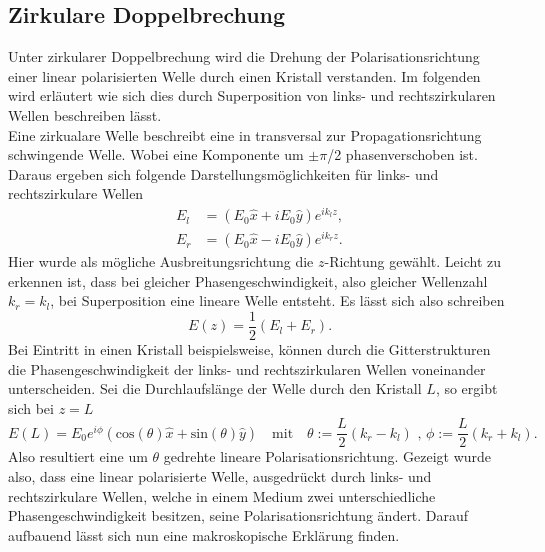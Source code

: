 \subsection{Zirkulare Doppelbrechung}

Unter zirkularer Doppelbrechung wird die Drehung der Polarisationsrichtung einer linear polarisierten Welle durch einen Kristall verstanden. 
Im folgenden wird erläutert wie sich dies durch Superposition von links- und rechtszirkularen Wellen beschreiben lässt.
\\
Eine zirkualare Welle beschreibt eine in transversal zur Propagationsrichtung schwingende Welle. Wobei eine Komponente um $\pm \pi$/2 phasenverschoben ist.
Daraus ergeben sich folgende Darstellungsmöglichkeiten für links- und rechtszirkulare Wellen
\begin{align}
    \label{eqn:crying1}
E_l &= (E_0 \hat{x} + i E_0 \hat{y}) e^{ik_l z}, \\
    \label{eqn:crying2}
E_r &= (E_0 \hat{x} - i E_0 \hat{y}) e^{ik_r z}.
\end{align}
Hier wurde als mögliche Ausbreitungsrichtung die $z$-Richtung gewählt. Leicht zu erkennen ist, dass bei gleicher Phasengeschwindigkeit, also gleicher Wellenzahl $k_r = k_l$, bei Superposition eine lineare Welle entsteht.
Es lässt sich also schreiben
\begin{equation*}
E(z) = \frac{1}{2} (E_l + E_r).
\end{equation*}
Bei Eintritt in einen Kristall beispielsweise, können durch die Gitterstrukturen die Phasengeschwindigkeit der links- und rechtszirkularen Wellen
voneinander unterscheiden. Sei die Durchlaufslänge der Welle durch den Kristall $L$, so ergibt sich bei $z=L$
\begin{equation*}
    E(L) = E_0 e^{i \phi} (\text{cos}(\theta)\hat{x} + \text{sin}(\theta) \hat{y} ) \quad \text{mit} \quad \theta := \frac{L}{2} (k_r - k_l) \text{ , } \phi := \frac{L}{2} (k_r + k_l).
\end{equation*}
Also resultiert eine um $\theta$ gedrehte lineare Polarisationsrichtung. Gezeigt wurde also, dass eine linear polarisierte Welle, ausgedrückt durch links- und 
rechtszirkulare Wellen, welche in einem Medium zwei
unterschiedliche Phasengeschwindigkeit besitzen, seine Polarisationsrichtung ändert.
Darauf aufbauend lässt sich nun eine makroskopische Erklärung finden.

